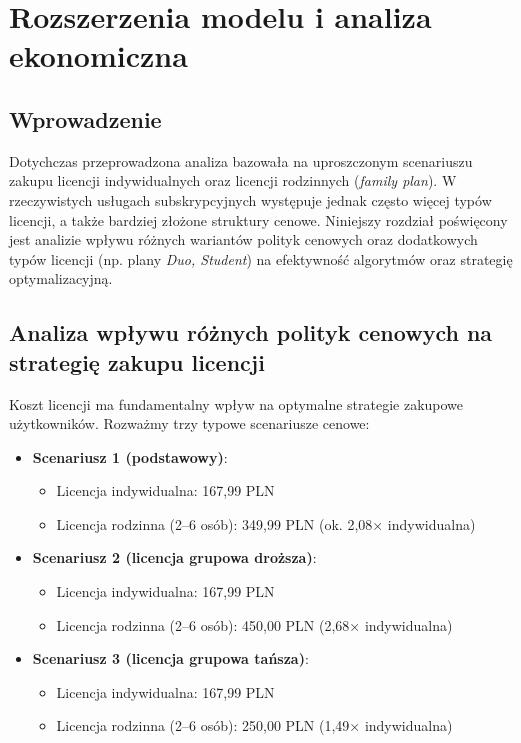 \chapter{Rozszerzenia modelu i analiza ekonomiczna}

\section{Wprowadzenie}

Dotychczas przeprowadzona analiza bazowała na uproszczonym scenariuszu zakupu licencji indywidualnych oraz licencji rodzinnych (\textit{family plan}). W rzeczywistych usługach subskrypcyjnych występuje jednak często więcej typów licencji, a także bardziej złożone struktury cenowe. Niniejszy rozdział poświęcony jest analizie wpływu różnych wariantów polityk cenowych oraz dodatkowych typów licencji (np. plany \textit{Duo, Student}) na efektywność algorytmów oraz strategię optymalizacyjną.

\section{Analiza wpływu różnych polityk cenowych na strategię zakupu licencji}

Koszt licencji ma fundamentalny wpływ na optymalne strategie zakupowe użytkowników. Rozważmy trzy typowe scenariusze cenowe:

\begin{itemize}
    \item \textbf{Scenariusz 1 (podstawowy)}:  
    \begin{itemize}
        \item Licencja indywidualna: 167,99 PLN  
        \item Licencja rodzinna (2–6 osób): 349,99 PLN (ok. 2,08× indywidualna)
    \end{itemize}

    \item \textbf{Scenariusz 2 (licencja grupowa droższa)}:  
    \begin{itemize}
        \item Licencja indywidualna: 167,99 PLN  
        \item Licencja rodzinna (2–6 osób): 450,00 PLN (2,68× indywidualna)
    \end{itemize}

    \item \textbf{Scenariusz 3 (licencja grupowa tańsza)}:  
    \begin{itemize}
        \item Licencja indywidualna: 167,99 PLN  
        \item Licencja rodzinna (2–6 osób): 250,00 PLN (1,49× indywidualna)
    \end{itemize}
\end{itemize}

